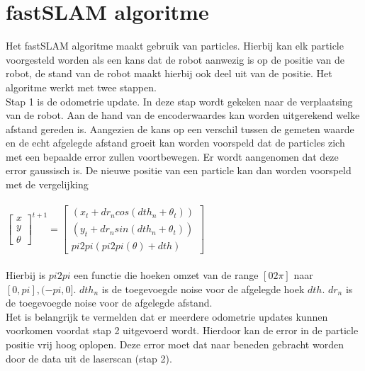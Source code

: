 \documentclass[a4paper]{article}
\begin{document}
\section{fastSLAM algoritme}
Het fastSLAM algoritme maakt gebruik van particles. Hierbij kan elk particle voorgesteld worden als een kans dat de robot aanwezig is op de positie van de robot, de stand van de robot maakt hierbij ook deel uit van de positie. Het algoritme werkt met twee stappen.\\
Stap 1 is de odometrie update. In deze stap wordt gekeken naar de verplaatsing van de robot. Aan de hand van de encoderwaardes kan worden uitgerekend welke afstand gereden is. Aangezien de kans op een verschil tussen de gemeten waarde en de echt afgelegde afstand groeit kan worden voorspeld dat de particles zich met een bepaalde error zullen voortbewegen. Er wordt aangenomen dat deze error gaussisch is. De nieuwe positie van een particle kan dan worden voorspeld met de vergelijking \\\\
$
\begin{bmatrix}
x\\
y\\
\theta
\end{bmatrix}^{t+1}
=
\begin{bmatrix}
(x_t + dr_n cos(dth_n + \theta_t))\\
(y_t + dr_n sin(dth_n + \theta_t)) \\
pi2pi(pi2pi(\theta) + dth)
\end{bmatrix}
$\\\\
Hierbij is $pi2pi$ een functie die hoeken omzet van de range $[0 2\pi]$ naar $[0,pi], (-pi, 0]$.
$dth_n$ is de toegevoegde noise voor de afgelegde hoek $dth$.
$dr_n$ is de toegevoegde noise voor de afgelegde afstand.\\
Het is belangrijk te vermelden dat er meerdere odometrie updates kunnen voorkomen voordat stap 2 uitgevoerd wordt. Hierdoor kan de error in de particle positie vrij hoog oplopen. Deze error moet dat naar beneden gebracht worden door de data uit de laserscan (stap 2).\\
\\
\end{document}
